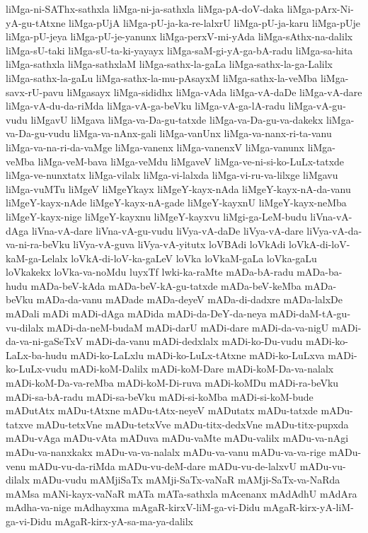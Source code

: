 {liMga-ni-SAThx-sathxla
liMga-ni-ja-sathxla
liMga-pA-doV-daka
liMga-pArx-Ni-yA-gu-tAtxne
liMga-pUjA
liMga-pU-ja-ka-re-lalxrU
liMga-pU-ja-karu
liMga-pUje
liMga-pU-jeya
liMga-pU-je-yanunx
liMga-perxV-mi-yAda
liMga-sAthx-na-dalilx
liMga-sU-taki
liMga-sU-ta-ki-yayayx
liMga-saM-gi-yA-ga-bA-radu
liMga-sa-hita
liMga-sathxla
liMga-sathxlaM
liMga-sathx-la-gaLa
liMga-sathx-la-ga-Lalilx
liMga-sathx-la-gaLu
liMga-sathx-la-mu-pAsayxM
liMga-sathx-la-veMba
liMga-savx-rU-pavu
liMgasayx
liMga-sididhx
liMga-vAda
liMga-vA-daDe
liMga-vA-dare
liMga-vA-du-da-riMda
liMga-vA-ga-beVku
liMga-vA-ga-lA-radu
liMga-vA-gu-vudu
liMgavU
liMgava
liMga-va-Da-gu-tatxde
liMga-va-Da-gu-va-dakekx
liMga-va-Da-gu-vudu
liMga-va-nAnx-gali
liMga-vanUnx
liMga-va-nanx-ri-ta-vanu
liMga-va-na-ri-da-vaMge
liMga-vanenx
liMga-vanenxV
liMga-vanunx
liMga-veMba
liMga-veM-bava
liMga-veMdu
liMgaveV
liMga-ve-ni-si-ko-LuLx-tatxde
liMga-ve-nunxtatx
liMga-vilalx
liMga-vi-lalxda
liMga-vi-ru-va-lilxge
liMgavu
liMga-vuMTu
liMgeV
liMgeYkayx
liMgeY-kayx-nAda
liMgeY-kayx-nA-da-vanu
liMgeY-kayx-nAde
liMgeY-kayx-nA-gade
liMgeY-kayxnU
liMgeY-kayx-neMba
liMgeY-kayx-nige
liMgeY-kayxnu
liMgeY-kayxvu
liMgi-ga-LeM-budu
liVna-vA-dAga
liVna-vA-dare
liVna-vA-gu-vudu
liVya-vA-daDe
liVya-vA-dare
liVya-vA-da-va-ni-ra-beVku
liVya-vA-guva
liVya-vA-yitutx
loVBAdi
loVkAdi
loVkA-di-loV-kaM-ga-Lelalx
loVkA-di-loV-ka-gaLeV
loVka
loVkaM-gaLa
loVka-gaLu
loVkakekx
loVka-va-noMdu
luyxTf
lwki-ka-raMte
mADa-bA-radu
mADa-ba-hudu
mADa-beV-kAda
mADa-beV-kA-gu-tatxde
mADa-beV-keMba
mADa-beVku
mADa-da-vanu
mADade
mADa-deyeV
mADa-di-dadxre
mADa-lalxDe
mADali
mADi
mADi-dAga
mADida
mADi-da-DeY-da-neya
mADi-daM-tA-gu-vu-dilalx
mADi-da-neM-budaM
mADi-darU
mADi-dare
mADi-da-va-nigU
mADi-da-va-ni-gaSeTxV
mADi-da-vanu
mADi-dedxlalx
mADi-ko-Du-vudu
mADi-ko-LaLx-ba-hudu
mADi-ko-LaLxlu
mADi-ko-LuLx-tAtxne
mADi-ko-LuLxva
mADi-ko-LuLx-vudu
mADi-koM-Dalilx
mADi-koM-Dare
mADi-koM-Da-va-nalalx
mADi-koM-Da-va-reMba
mADi-koM-Di-ruva
mADi-koMDu
mADi-ra-beVku
mADi-sa-bA-radu
mADi-sa-beVku
mADi-si-koMba
mADi-si-koM-bude
mADutAtx
mADu-tAtxne
mADu-tAtx-neyeV
mADutatx
mADu-tatxde
mADu-tatxve
mADu-tetxVne
mADu-tetxVve
mADu-titx-dedxVne
mADu-titx-pupxda
mADu-vAga
mADu-vAta
mADuva
mADu-vaMte
mADu-valilx
mADu-va-nAgi
mADu-va-nanxkakx
mADu-va-va-nalalx
mADu-va-vanu
mADu-va-va-rige
mADu-venu
mADu-vu-da-riMda
mADu-vu-deM-dare
mADu-vu-de-lalxvU
mADu-vu-dilalx
mADu-vudu
mAMjiSaTx
mAMji-SaTx-vaNaR
mAMji-SaTx-va-NaRda
mAMsa
mANi-kayx-vaNaR
mATa
mATa-sathxla
mAcenanx
mAdAdhU
mAdAra
mAdha-va-nige
mAdhayxma
mAgaR-kirxV-liM-ga-vi-Didu
mAgaR-kirx-yA-liM-ga-vi-Didu
mAgaR-kirx-yA-sa-ma-ya-dalilx
}
